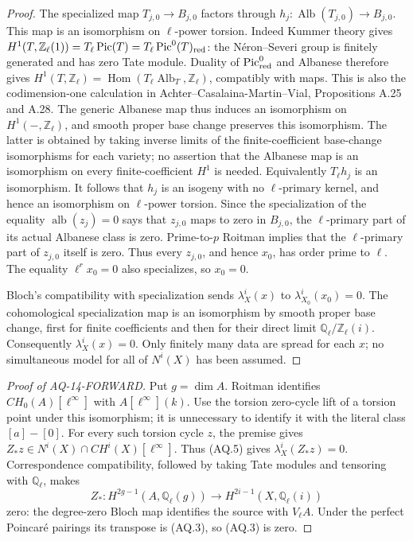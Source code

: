 \begin{proof}
The specialized map $T_{j,0}\to B_{j,0}$ factors through
$h_j:\operatorname{Alb}(T_{j,0})\to B_{j,0}$. This map is an
isomorphism on $\ell$-power torsion. Indeed Kummer theory gives
$H^1(T,\mathbb Z_\ell(1))=T_\ell\operatorname{Pic}(T)
=T_\ell\operatorname{Pic}^0(T)_{\rm red}$: the N\'eron--Severi
group is finitely generated and has zero Tate module.
Duality of $\operatorname{Pic}^0_{\rm red}$ and Albanese
therefore gives
$H^1(T,\mathbb Z_\ell)=\operatorname{Hom}(T_\ell
\operatorname{Alb}_T,\mathbb Z_\ell)$, compatibly with maps.
This is also the codimension-one calculation in
Achter--Casalaina-Martin--Vial, Propositions A.25 and A.28.
The generic Albanese map thus induces an isomorphism on
$H^1(-,\mathbb Z_\ell)$, and smooth proper base change
preserves this isomorphism. The latter is obtained
by taking inverse limits of the finite-coefficient base-change
isomorphisms for each variety; no assertion that the Albanese
map is an isomorphism on every finite-coefficient $H^1$ is
needed. Equivalently $T_\ell h_j$ is an isomorphism.
It follows that $h_j$ is an isogeny with no $\ell$-primary
kernel, and hence an isomorphism on $\ell$-power torsion.
Since the specialization of the equality
$\operatorname{alb}(z_j)=0$ says that $z_{j,0}$ maps to zero
in $B_{j,0}$, the $\ell$-primary part of its actual Albanese
class is zero. Prime-to-$p$ Roitman implies that the
$\ell$-primary part of $z_{j,0}$ itself is zero. Thus every
$z_{j,0}$, and hence $x_0$, has order prime to $\ell$.
The equality $\ell^r x_0=0$ also specializes, so $x_0=0$.

Bloch's compatibility with specialization sends
$\lambda_X^i(x)$ to $\lambda_{X_0}^i(x_0)=0$. The
cohomological specialization map is an isomorphism by
smooth proper base change, first for finite coefficients
and then for their direct limit $\mathbb Q_\ell/\mathbb Z_\ell(i)$.
Consequently $\lambda_X^i(x)=0$. Only finitely many data are
spread for each $x$; no simultaneous model for all of $N^i(X)$
has been assumed.
\end{proof}

\begin{proof}[Proof of AQ-14-FORWARD]
Put $g=\dim A$. Roitman identifies
$CH_0(A)[\ell^\infty]$ with $A[\ell^\infty](k)$.
Use the torsion zero-cycle lift of a torsion point under this
isomorphism; it is unnecessary to identify it with the
literal class $[a]-[0]$. For every such torsion cycle $z$,
the premise gives $Z_*z\in N^i(X)\cap CH^i(X)[\ell^\infty]$.
Thus (AQ.5) gives $\lambda_X^i(Z_*z)=0$.
Correspondence compatibility, followed by taking Tate modules
and tensoring with $\mathbb Q_\ell$, makes
\[
 Z_*:H^{2g-1}(A,\mathbb Q_\ell(g))
             \longrightarrow H^{2i-1}(X,\mathbb Q_\ell(i))
\]
zero: the degree-zero Bloch map identifies the source
with $V_\ell A$. Under the perfect Poincar\'e pairings its
transpose is (AQ.3), so (AQ.3) is zero.
\end{proof}

